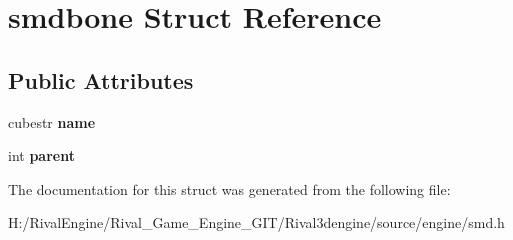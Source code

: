 \hypertarget{structsmdbone}{}\section{smdbone Struct Reference}
\label{structsmdbone}
\subsection*{Public Attributes}
\begin{DoxyCompactItemize}
\item 
\mbox{\label{structsmdbone_a543de032756542c712eacc85fb51ff68}} 
cubestr {\bfseries name}
\item 
\mbox{\label{structsmdbone_ade4b4bcc9d1eef6e9b85f074e37dd05b}} 
int {\bfseries parent}
\end{DoxyCompactItemize}


The documentation for this struct was generated from the following file\+:\begin{DoxyCompactItemize}
\item 
H\+:/\+Rival\+Engine/\+Rival\+\_\+\+Game\+\_\+\+Engine\+\_\+\+G\+I\+T/\+Rival3dengine/source/engine/smd.\+h\end{DoxyCompactItemize}
